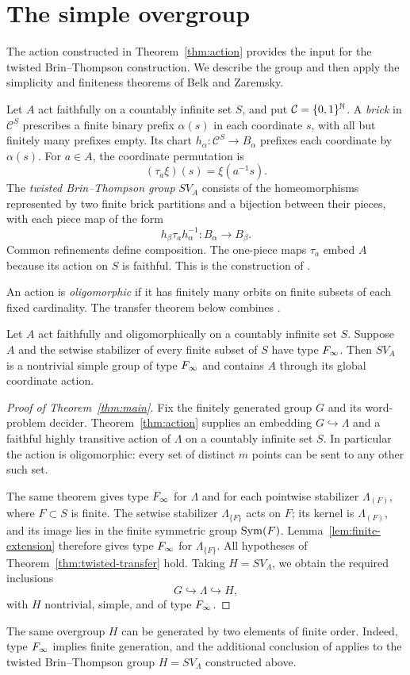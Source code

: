 \section{The simple overgroup}\label{sec:simple}

The action constructed in Theorem~\ref{thm:action} provides the input for
the twisted Brin--Thompson construction.  We describe the group and then
apply the simplicity and finiteness theorems of Belk and Zaremsky.

Let $A$ act faithfully on a countably infinite set $S$, and put
$\mathcal C=\{0,1\}^{\mathbb N}$.  A \emph{brick} in $\mathcal C^S$ prescribes a
finite binary prefix $\alpha(s)$ in each coordinate $s$, with all but
finitely many prefixes empty.  Its chart
$h_\alpha:\mathcal C^S\to B_\alpha$ prefixes each coordinate by
$\alpha(s)$.  For $a\in A$, the coordinate permutation is
\[
 (\tau_a\xi)(s)=\xi(a^{-1}s).
\]
The \emph{twisted Brin--Thompson group} $SV_A$ consists of the
homeomorphisms represented by two finite brick partitions and a
bijection between their pieces, with each piece map of the form
\[
 h_\beta\tau_a h_\alpha^{-1}:B_\alpha\longrightarrow B_\beta.
\]
Common refinements define composition.  The one-piece maps $\tau_a$
embed $A$ because its action on $S$ is faithful.
This is the construction of \citet[Section~1]{BelkZaremsky2022}.

An action is \emph{oligomorphic} if it has finitely many orbits on
finite subsets of each fixed cardinality.  The transfer theorem below
combines \citet[Theorem~D, with $n=\infty$, and
Theorem~3.4]{BelkZaremsky2022}.

\begin{theorem}\label{thm:twisted-transfer}
Let \(A\) act faithfully and oligomorphically on a countably infinite
set \(S\). Suppose \(A\) and the setwise stabilizer of every finite
subset of \(S\) have type \(F_\infty\).
Then \(SV_A\) is a nontrivial simple group of type \(F_\infty\)
and contains \(A\) through its global coordinate action.
\end{theorem}

\begin{proof}[Proof of Theorem~\ref{thm:main}]
Fix the finitely generated group \(G\) and its word-problem decider.
Theorem~\ref{thm:action} supplies an embedding
\(G\hookrightarrow\Lambda\) and a faithful highly transitive action
of \(\Lambda\) on a countably infinite set \(S\). In particular the
action is oligomorphic: every set of distinct \(m\) points can be
sent to any other such set.

The same theorem gives type \(F_\infty\) for \(\Lambda\) and for each
pointwise stabilizer \(\Lambda_{(F)}\), where \(F\subset S\) is finite.
The setwise stabilizer \(\Lambda_{\{F\}}\) acts on \(F\); its kernel is
\(\Lambda_{(F)}\), and its image lies in the finite symmetric group
\(\operatorname{Sym}(F)\). Lemma~\ref{lem:finite-extension} therefore gives type
\(F_\infty\) for \(\Lambda_{\{F\}}\).
All hypotheses of Theorem~\ref{thm:twisted-transfer} hold. Taking
\(H=SV_\Lambda\), we obtain the required inclusions
\[
 G\hookrightarrow\Lambda\hookrightarrow H,
\]
with \(H\) nontrivial, simple, and of type \(F_\infty\).
\end{proof}

The same overgroup $H$ can be generated by two elements of finite order.
Indeed, type $F_\infty$ implies finite generation, and the additional
conclusion of \citet[Theorem~3.4]{BelkZaremsky2022} applies to the
twisted Brin--Thompson group $H=SV_\Lambda$ constructed above.
